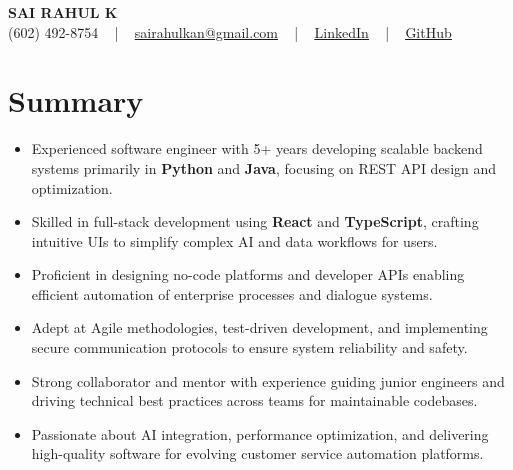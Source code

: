 \documentclass[letterpaper,11pt]{article}
\newcommand{\resumeItem}[1]{
  \item\footnotesize{
    {#1 \vspace{-2pt}}
  }
}
\newcommand{\resumeItemListStart}{\begin{itemize}[leftmargin=*]}
\newcommand{\resumeItemListEnd}{\end{itemize}\vspace{-5pt}}
\begin{document}
\begin{center}
    {\fontsize{14pt}{12pt}\selectfont \textbf{\MakeUppercase{Sai Rahul K}}}\\ \vspace{2pt}
    \fontsize{10pt}{12pt}\selectfont (602) 492-8754 ~ | ~ \href{mailto:sairahulkan@gmail.com}{sairahulkan@gmail.com} ~ | ~
    \href{https://www.linkedin.com/in/rq123/}{\color{blue}\underline{LinkedIn}} ~ | ~
    \href{https://github.com/kanrahuldo}{\color{blue}\underline{GitHub}}~
    \vspace{-8pt}
\end{center}

\section{Summary}
\fontsize{9pt}{10pt}\selectfont
\resumeItemListStart
    \resumeItem{Experienced software engineer with 5+ years developing scalable backend systems primarily in \textbf{Python} and \textbf{Java}, focusing on REST API design and optimization.} \vspace{-3pt}
    \resumeItem{Skilled in full-stack development using \textbf{React} and \textbf{TypeScript}, crafting intuitive UIs to simplify complex AI and data workflows for users.} \vspace{-3pt}
    \resumeItem{Proficient in designing no-code platforms and developer APIs enabling efficient automation of enterprise processes and dialogue systems.} \vspace{-3pt}
    \resumeItem{Adept at Agile methodologies, test-driven development, and implementing secure communication protocols to ensure system reliability and safety.} \vspace{-3pt}
    \resumeItem{Strong collaborator and mentor with experience guiding junior engineers and driving technical best practices across teams for maintainable codebases.} \vspace{-3pt}
    \resumeItem{Passionate about AI integration, performance optimization, and delivering high-quality software for evolving customer service automation platforms.} \vspace{-3pt}
\resumeItemListEnd
\vspace{-6pt}
\end{document}
